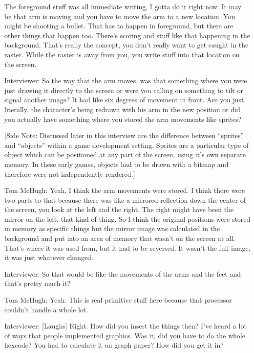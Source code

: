 The foreground stuff was all immediate writing, I gotta do it right now. It may be that arm is moving and you have to move the arm to a new location. You might be shooting a bullet. That has to happen in foreground, but there are other things that happen too. There’s scoring and stuff like that happening in the background. That’s really the concept, you don’t really want to get caught in the raster. While the raster is away from you, you write stuff into that location on the screen.

\textcolor{interviewer}{Interviewer:} So the way that the arm moves, was that something where you were just drawing it directly to the screen or were you calling on something to tilt or signal another image? It had like six degrees of movement in front. Are you just literally, the character’s being redrawn with his arm in the new position or did you actually have something where you stored the arm movements like sprites? 

[Side Note: Discussed later in this interview are the difference between “sprites” and “objects” within a game development setting. Sprites are a particular type of object which can be positioned at any part of the screen, using it’s own separate memory. In these early games, objects had to be drawn with a bitmap and therefore were not independently rendered.]

\textcolor{interviewee}{Tom McHugh:} Yeah, I think the arm movements were stored. I think there were two parts to that because there was like a mirrored reflection down the center of the screen, you look at the left and the right. The right might have been the mirror on the left, that kind of thing. So I think the original positions were stored in memory as specific things but the mirror image was calculated in the background and put into an area of memory that wasn’t on the screen at all. That’s where it was used from, but it had to be reversed. It wasn’t the full image, it was just whatever changed.

\textcolor{interviewer}{Interviewer:} So that would be like the movements of the arms and the feet and that’s pretty much it?

\textcolor{interviewee}{Tom McHugh:} Yeah. This is real primitive stuff here because that processor couldn’t handle a whole lot.

\textcolor{interviewer}{Interviewer:} [Laughs] Right. How did you insert the things then? I’ve heard a lot of ways that people implemented graphics. Was it, did you have to do the whole hexcode? You had to calculate it on graph paper? How did you get it in?

